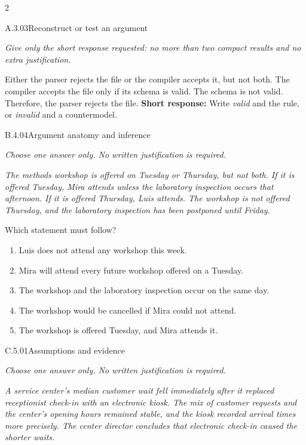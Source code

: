 \documentclass[9pt]{extarticle}
\newcommand{\choice}[1]{\item #1}
\begin{document}
\CoreWorkArea
\FormBreak
{}
\begin{multicols}{2}
\begin{DenseCoreProblem}{A.3.03}{Reconstruct or test an argument}
{\scriptsize\textit{Give only the short response requested: no more than two compact results and no extra justification.}\par}
Either the parser rejects the file or the compiler accepts it, but not both. The compiler accepts the file only if its schema is valid. The schema is not valid. Therefore, the parser rejects the file.
\textbf{Short response:} Write \emph{valid} and the rule, or \emph{invalid} and a countermodel.
\end{DenseCoreProblem}
\begin{DenseCoreProblem}{B.4.04}{Argument anatomy and inference}
{\scriptsize\textit{Choose one answer only. No written justification is required.}\par}
\emph{The methods workshop is offered on Tuesday or Thursday, but not both. If it is offered Tuesday, Mira attends unless the laboratory inspection occurs that afternoon. If it is offered Thursday, Luis attends. The workshop is not offered Thursday, and the laboratory inspection has been postponed until Friday.}

Which statement must follow?
\begin{enumerate}[label=(\alph*)]
  \choice{Luis does not attend any workshop this week.}
  \choice{Mira will attend every future workshop offered on a Tuesday.}
  \choice{The workshop and the laboratory inspection occur on the same day.}
  \choice{The workshop would be cancelled if Mira could not attend.}
  \choice{The workshop is offered Tuesday, and Mira attends it.}
\end{enumerate}
\end{DenseCoreProblem}
\columnbreak
\begin{DenseCoreProblem}{C.5.01}{Assumptions and evidence}
{\scriptsize\textit{Choose one answer only. No written justification is required.}\par}
\emph{A service center's median customer wait fell immediately after it replaced receptionist check-in with an electronic kiosk. The mix of customer requests and the center's opening hours remained stable, and the kiosk recorded arrival times more precisely. The center director concludes that electronic check-in caused the shorter waits.}


\end{DenseCoreProblem}
\end{multicols}
\end{document}
